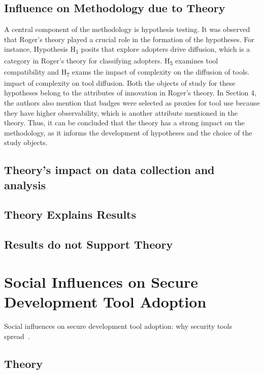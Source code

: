 \documentclass[journal,12pt,onecolumn,]{IEEEtran}
\begin{document}
\subsection{Influence on Methodology due to Theory}
A central component of the methodology is hypothesis testing. It was observed that Roger's theory played a crucial role in the formation of the hypotheses.
For instance, Hypothesis H\textsubscript{1}  posits that explore adopters drive diffusion, which is a category in Roger's theory for classifying adopters.
H\textsubscript{5} examines tool compatibility and H\textsubscript{7} exams the impact of complexity on the diffusion of tools. impact of complexity on tool diffusion. Both the objects of study for these hypotheses belong to the attributes of innovation in Roger's theory. 
In Section 4, the authors also mention that badges were selected as proxies for tool use because they have higher observability, which is another attribute mentioned in the theory.
Thus, it can be concluded that the theory has a strong impact on the methodology, as it informs the development of hypotheses and the choice of the study objects.

\subsection{Theory's impact on data collection and analysis}

\subsection{Theory Explains Results}
\subsection{Results do not Support Theory} %


\section{Social Influences on Secure Development Tool Adoption}

Social influences on secure development tool adoption: why security tools spread~\cite{xiao2014social}.


\subsection{Theory}
\end{document}
